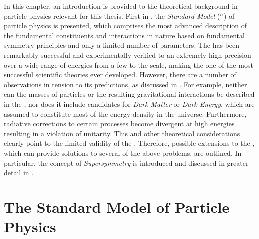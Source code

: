 
In this chapter, an introduction is provided to the theoretical background in particle physics relevant for this thesis.
First in , the \emph{Standard Model} (`\sm') of particle physics is presented, which comprises the most advanced description of the fundamental constituents and interactions in nature based on fundamental symmetry principles and only a limited number of parameters.
The \sm has been remarkably successful and experimentally verified to an extremely high precision over a wide range of energies from a few \evnospace to the \tevnospace scale, making the \sm one of the most successful scientific theories ever developed.
However, there are a number of observations in tension to its predictions, as discussed in .
For example, neither can the masses of particles or the resulting gravitational interactions be described in the \sm, nor does it include candidates for \emph{Dark Matter} or \emph{Dark Energy}, which are assumed to constitute most of the energy density in the universe.
Furthermore, radiative corrections to certain processes become divergent at high energies resulting in a violation of unitarity.
This and other theoretical considerations clearly point to the limited validity of the \sm.
Therefore, possible extensions to the \sm, which can provide solutions to several of the above problems, are outlined.
In particular, the concept of \emph{Supersymmetry} is introduced and discussed in greater detail in .



\section{The Standard Model of Particle Physics}\label{sec:Theory:SM}
